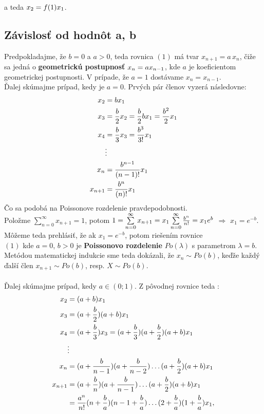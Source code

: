 \documentclass[a4paper,10pt]{article}
\theoremstyle{plain}
\theoremstyle{definition}
\begin{document}
\noindent a teda $ x_{2} = f(1)\*x_{1} $. 
\newpage
\subsection{Závislosť od hodnôt a, b}

Predpokladajme, že $ b=0 $ a $ a > 0 $, teda rovnica $ (1) $ má tvar $ x_{n+1} = a\,x_{n} $, čiže sa jedná o \textbf{geometrickú postupnosť}
$ x_{n} = a\*x_{n-1} $, kde $ a $ je koeficientom geometrickej postupnosti. V prípade, že $ a = 1 $ dostávame $ x_{n} = x_{n-1} $.
\\Ďalej skúmajme prípad, kedy je $ a=0 $. Prvých pár členov vyzerá následovne: 
\begin{align*}
x_{2}&=b\*x_{1}\\
x_{3}&=\frac{b}{2}\*x_{2} = \frac{b}{2}\*b\*x_{1}=\frac{b^{2}}{2}\*x_{1} \\
x_{4}&=\frac{b}{3}\*x_{3} = \frac{b^{3}}{3!}\*x_{1}  \\
&\vdots \\
x_{n}&=\frac{b^{n-1}}{(n-1)!}\*x_{1}    \\
x_{n+1}&=\frac{b^{n}}{(n)!}\*x_{1}   \\
\end{align*}
Čo sa podobá na Poissonove rozdelenie pravdepodobnosti. \\
Položme $ \sum\limits_{n=0}^\infty x_{n+1} = 1 $, potom $ 1=\sum\limits_{n=0}^\infty x_{n+1} = x_{1}\*\sum\limits_{n=0}^\infty \frac{b^{n}}{n!} = x_{1}\*e^{b}$ $ \Rightarrow $ $ x_{1} = e^{-b} $.
Môžeme teda prehlásiť, že ak $x_{1}=e^{-b} $, potom riešením rovnice\\
$(1)$ kde $a=0$, $b>0$
je \textbf{Poissonovo rozdelenie} $Po(\lambda)$ s parametrom $\lambda=b$.\\
Metódou matematickej indukcie sme teda dokázali, že $x_{n}\sim Po(b)$, keďže každý ďalší člen $x_{n+1}\sim Po(b)$, resp. $ X \sim Po(b)$.\\
\\Ďalej skúmajme prípad, kedy $ a \in (0;1) $. Z pôvodnej rovnice teda :
\begin{align*}
x_{2}&=(a+b)\*x_{1} \\
x_{3}&=(a + \frac{b}{2}) \* (a + b)\*x_{1} \\
x_{4}&=(a + \frac{b}{3})\*x_{3}= (a + \frac{b}{3})\*(a + \frac{b}{2})\*(a + b)\*x_{1} \\
&\vdots \\
x_{n}&=(a + \frac{b}{n-1})\*(a + \frac{b}{n-2}) \ldots (a + \frac{b}{2})\*(a + b)\*x_{1}\\
x_{n+1}&=(a + \frac{b}{n})\*(a + \frac{b}{n-1}) \ldots (a + \frac{b}{2})\*(a + b)\*x_{1}\\
&=\frac{a^{n}}{n!}\*(n + \frac{b}{a})\*(n-1 + \frac{b}{a}) \ldots (2 + \frac{b}{a})\*(1 + \frac{b}{a})\*x_{1},
\end{align*}
\end{document}
